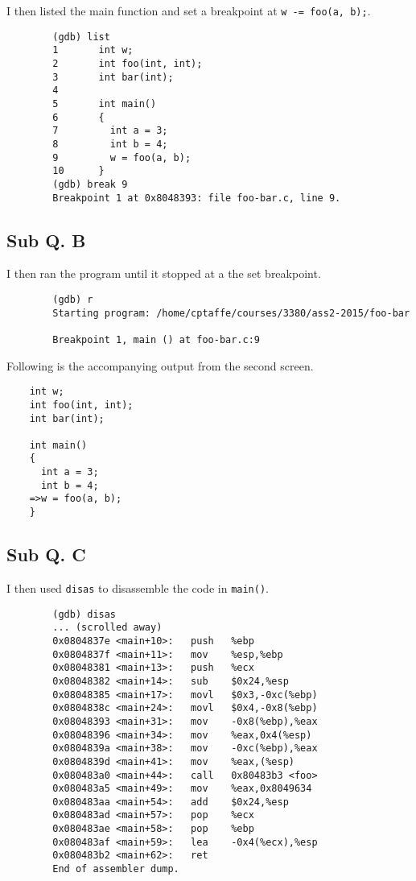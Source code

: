 \documentclass[letterpaper, 10pt]{article}
\begin{document}
	I then listed the main function and set a breakpoint at {\tt w -= foo(a, b);}.

	\begin{verbatim}
		(gdb) list
		1       int w;
		2       int foo(int, int);
		3       int bar(int);
		4
		5       int main()
		6       {
		7         int a = 3;
		8         int b = 4;
		9         w = foo(a, b);
		10      }
		(gdb) break 9
		Breakpoint 1 at 0x8048393: file foo-bar.c, line 9.
	\end{verbatim}

	\subsection*{Sub Q. B}

	I then ran the program until it stopped at a the set breakpoint.

	\begin{verbatim}
		(gdb) r
		Starting program: /home/cptaffe/courses/3380/ass2-2015/foo-bar

		Breakpoint 1, main () at foo-bar.c:9
	\end{verbatim}

	Following is the accompanying output from the second screen.

	\begin{verbatim}
	int w;
	int foo(int, int);
	int bar(int);

	int main()
	{
	  int a = 3;
	  int b = 4;
	=>w = foo(a, b);
	}
	\end{verbatim}

	\subsection*{Sub Q. C}

	I then used {\tt disas} to disassemble the code in {\tt main()}.

	\begin{verbatim}
		(gdb) disas
		... (scrolled away)
		0x0804837e <main+10>:   push   %ebp
		0x0804837f <main+11>:   mov    %esp,%ebp
		0x08048381 <main+13>:   push   %ecx
		0x08048382 <main+14>:   sub    $0x24,%esp
		0x08048385 <main+17>:   movl   $0x3,-0xc(%ebp)
		0x0804838c <main+24>:   movl   $0x4,-0x8(%ebp)
		0x08048393 <main+31>:   mov    -0x8(%ebp),%eax
		0x08048396 <main+34>:   mov    %eax,0x4(%esp)
		0x0804839a <main+38>:   mov    -0xc(%ebp),%eax
		0x0804839d <main+41>:   mov    %eax,(%esp)
		0x080483a0 <main+44>:   call   0x80483b3 <foo>
		0x080483a5 <main+49>:   mov    %eax,0x8049634
		0x080483aa <main+54>:   add    $0x24,%esp
		0x080483ad <main+57>:   pop    %ecx
		0x080483ae <main+58>:   pop    %ebp
		0x080483af <main+59>:   lea    -0x4(%ecx),%esp
		0x080483b2 <main+62>:   ret
		End of assembler dump.
	\end{verbatim}
\end{document}
